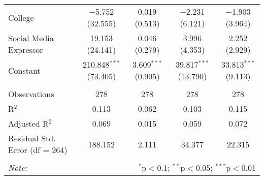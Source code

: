 \begin{table}[H]
{\begin{tabular}{@{\extracolsep{5pt}}lcccc}
  College & $-$5.752 (32.555) & 0.019 (0.513) & $-$2.231 (6.121) & $-$1.903 (3.964) \\ 
  Social Media Expressor & 19.153 (24.141) & 0.046 (0.279) & 3.996 (4.353) & 2.252 (2.929) \\ 
  Constant & 210.848$^{***}$ (73.405) & 3.609$^{***}$ (0.905) & 39.817$^{***}$ (13.790) & 33.813$^{***}$ (9.113) \\ 
 \hline \\[-1.8ex] 
Observations & 278 & 278 & 278 & 278 \\ 
R$^{2}$ & 0.113 & 0.062 & 0.103 & 0.115 \\ 
Adjusted R$^{2}$ & 0.069 & 0.015 & 0.059 & 0.072 \\ 
Residual Std. Error (df = 264) & 188.152 & 2.111 & 34.377 & 22.315 \\ 
\hline 
\hline \\[-1.8ex] 
\textit{Note:}  & \multicolumn{4}{r}{$^{*}$p$<$0.1; $^{**}$p$<$0.05; $^{***}$p$<$0.01} \\ 
\end{tabular} 
}
\end{table} 
